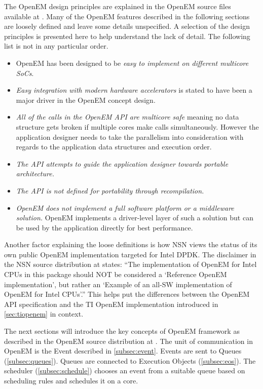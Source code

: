 The OpenEM design principles are explained in the OpenEM source files available at \cite{openempage}. Many of the OpenEM features described in the following sections are loosely defined and leave some details unspecified. A selection of the design principles is presented here to help understand the lack of detail.  The following list is not in any particular order.
\begin{itemize}
    \item OpenEM has been designed to be \emph{easy to implement on different multicore SoCs}.
    \item \emph{Easy integration with modern hardware accelerators} is stated to have been a major driver in the OpenEM concept design.
    \item \emph{All of the calls in the OpenEM API are multicore safe} meaning no data structure gets broken if multiple cores make calls simultaneously. However the application designer needs to take the parallelism into consideration with regards to the application data structures and execution order.
    \item \emph{The API attempts to guide the application designer towards portable architecture.}
    \item \emph{The API is not defined for portability through recompilation.}
    \item \emph{OpenEM does not implement a full software platform or a middleware solution.} OpenEM implements a driver-level layer of such a solution but can be used by the application directly for best performance.
\end{itemize}

Another factor explaining the loose definitions is how NSN views the status of its own public OpenEM implementation targeted for Intel DPDK. The disclaimer in the NSN source distribution at \cite{openempage} states: ``The implementation of OpenEM for Intel CPUs in this package should NOT be considered a `Reference OpenEM implementation', but rather an `Example of an all-SW implementation of OpenEM for Intel CPUs'.'' This helps put the differences between the OpenEM API specification and the TI OpenEM implementation introduced in \ref{sec:tiopenem} in context.

The next sections will introduce the key concepts of OpenEM framework as described in the OpenEM source distribution at \cite{openempage}. The unit of communication in OpenEM is the Event described in \ref{subsec:event}. Events are sent to Queues (\ref{subsec:queues}). Queues are connected to Execution Objects (\ref{subsec:eos}). The scheduler (\ref{subsec:schedule}) chooses an event from a suitable queue based on scheduling rules and schedules it on a core.

